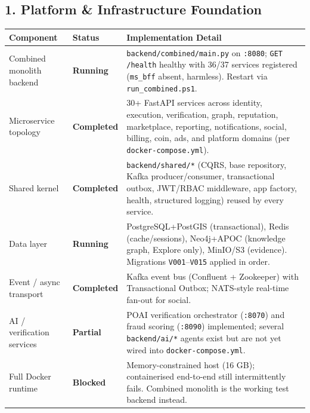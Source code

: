 \documentclass[11pt,a4paper]{article}
\newcommand{\status}[1]{\textcolor{masarengreen}{\bfseries #1}}
\newcommand{\wip}[1]{\textcolor{masarenamber}{\bfseries #1}}
\newcommand{\gap}[1]{\textcolor{masarenred}{\bfseries #1}}
\newcommand{\code}[1]{\texttt{#1}}
\begin{document}
\subsection*{1. Platform \& Infrastructure Foundation}
\begin{tabularx}{\textwidth}{L{4.6cm}L{2.4cm}Y}
\toprule
\textbf{Component} & \textbf{Status} & \textbf{Implementation Detail} \\
\midrule
Combined monolith backend & \status{Running} & \code{backend/combined/main.py} on \code{:8080}; \code{GET /health} healthy with 36/37 services registered (\code{ms\_bff} absent, harmless). Restart via \code{run\_combined.ps1}. \\
\hline
Microservice topology & \status{Completed} & 30+ FastAPI services across identity, execution, verification, graph, reputation, marketplace, reporting, notifications, social, billing, coin, ads, and platform domains (per \code{docker-compose.yml}). \\
\hline
Shared kernel & \status{Completed} & \code{backend/shared/*} (CQRS, base repository, Kafka producer/consumer, transactional outbox, JWT/RBAC middleware, app factory, health, structured logging) reused by every service. \\
\hline
Data layer & \status{Running} & PostgreSQL+PostGIS (transactional), Redis (cache/sessions), Neo4j+APOC (knowledge graph, Explore only), MinIO/S3 (evidence). Migrations \code{V001}--\code{V015} applied in order. \\
\hline
Event / async transport & \status{Completed} & Kafka event bus (Confluent + Zookeeper) with Transactional Outbox; NATS-style real-time fan-out for social. \\
\hline
AI / verification services & \wip{Partial} & POAI verification orchestrator (\code{:8070}) and fraud scoring (\code{:8090}) implemented; several \code{backend/ai/*} agents exist but are not yet wired into \code{docker-compose.yml}. \\
\hline
Full Docker runtime & \gap{Blocked} & Memory-constrained host (16 GB); containerised end-to-end still intermittently fails. Combined monolith is the working test backend instead. \\
\bottomrule
\end{tabularx}

\vspace{0.6em}
\end{document}
